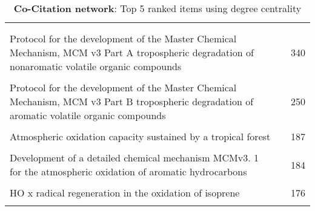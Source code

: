 \begin{table}[H]
     \begin{tabular}{p{}p{}c}
     \toprule
      & & \\\\
     Protocol for the development of the Master Chemical Mechanism, MCM v3 Part A tropospheric degradation of nonaromatic volatile organic compounds & \cite{degree0} & 340  \\ \\
        Protocol for the development of the Master Chemical Mechanism, MCM v3 Part B tropospheric degradation of aromatic volatile organic compounds & \cite{degree1} & 250  \\ \\
        Atmospheric oxidation capacity sustained by a tropical forest & \cite{degree2} & 187  \\ \\
        Development of a detailed chemical mechanism MCMv3. 1 for the atmospheric oxidation of aromatic hydrocarbons & \cite{degree3} & 184  \\ \\
        HO x radical regeneration in the oxidation of isoprene & \cite{degree4} & 176  \\ \\
        \bottomrule
    \end{tabular}
    \label{tab:degree_Co-Citation}
    \caption{\textbf{Co-Citation network}: Top 5 ranked items using degree centrality}
    \end{table}

    